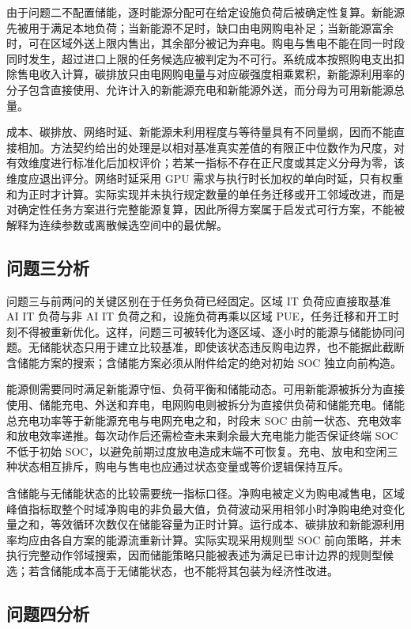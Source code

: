 \documentclass[withoutpreface,bwprint]{cumcmthesis}
\begin{document}
由于问题二不配置储能，逐时能源分配可在给定设施负荷后被确定性复算。新能源先被用于满足本地负荷；当新能源不足时，缺口由电网购电补足；当新能源富余时，可在区域外送上限内售出，其余部分被记为弃电。购电与售电不能在同一时段同时发生，超过进口上限的任务候选应被判定为不可行。系统成本按照购电支出扣除售电收入计算，碳排放只由电网购电量与对应碳强度相乘累积，新能源利用率的分子包含直接使用、允许计入的新能源充电和新能源外送，而分母为可用新能源总量。

成本、碳排放、网络时延、新能源未利用程度与等待量具有不同量纲，因而不能直接相加。方法契约给出的处理是以相对基准真实差值的有限正中位数作为尺度，对有效维度进行标准化后加权评价；若某一指标不存在正尺度或其定义分母为零，该维度应退出评分。网络时延采用 GPU 需求与执行时长加权的单向时延，只有权重和为正时才计算。实际实现并未执行规定数量的单任务迁移或开工邻域改进，而是对确定性任务方案进行完整能源复算，因此所得方案属于启发式可行方案，不能被解释为连续参数或离散候选空间中的最优解。

\subsection{问题三分析}

问题三与前两问的关键区别在于任务负荷已经固定。区域 IT 负荷应直接取基准 AI IT 负荷与非 AI IT 负荷之和，设施负荷再乘以区域 PUE，任务迁移和开工时刻不得被重新优化。这样，问题三可被转化为逐区域、逐小时的能源与储能协同问题。无储能状态只用于建立比较基准，即使该状态违反购电边界，也不能据此截断含储能方案的搜索；含储能方案必须从附件给定的绝对初始 SOC 独立向前构造。

能源侧需要同时满足新能源守恒、负荷平衡和储能动态。可用新能源被拆分为直接使用、储能充电、外送和弃电，电网购电则被拆分为直接供负荷和储能充电。储能总充电功率等于新能源充电与电网充电之和，时段末 SOC 由前一状态、充电效率和放电效率递推。每次动作后还需检查未来剩余最大充电能力能否保证终端 SOC 不低于初始 SOC，以避免前期过度放电造成末端不可恢复。充电、放电和空闲三种状态相互排斥，购电与售电也应通过状态变量或等价逻辑保持互斥。

含储能与无储能状态的比较需要统一指标口径。净购电被定义为购电减售电，区域峰值指标取整个时域净购电的非负最大值，负荷波动采用相邻小时净购电绝对变化量之和，等效循环次数仅在储能容量为正时计算。运行成本、碳排放和新能源利用率均应由各自方案的能源流重新计算。实际实现采用规则型 SOC 前向策略，并未执行完整动作邻域搜索，因而储能策略只能被表述为满足已审计边界的规则型候选；若含储能成本高于无储能状态，也不能将其包装为经济性改进。

\subsection{问题四分析}
\end{document}

